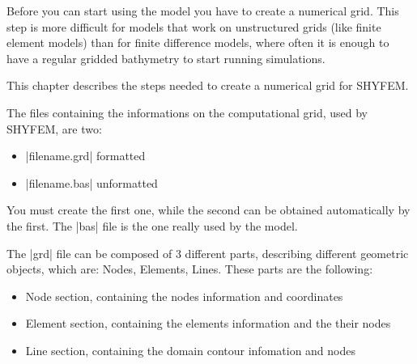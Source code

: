 
%
%
%
%
%
%
%

Before you can start using the model you have to create a numerical grid.
This step is more difficult for models that work on unstructured grids
(like finite element models) than for finite difference models, where
often it is enough to have a regular gridded bathymetry to start running
simulations.

This chapter describes the steps needed to create a numerical grid for SHYFEM.

The files containing the informations on the computational grid, used by SHYFEM, are two:

\begin{itemize}
\item |filename.grd| formatted
\item |filename.bas| unformatted
\end{itemize}

You must create the first one, while the second can be obtained automatically by
the first. The |bas| file is the one really used by the model.

The |grd| file can be composed of 3 different parts, describing different geometric
objects, which are: Nodes, Elements, Lines. These parts are the following:

\begin{itemize}
\item Node section, containing the nodes information and coordinates
\item Element section, containing the elements information and the their nodes
\item Line section, containing the domain contour infomation and nodes
\end{itemize}

